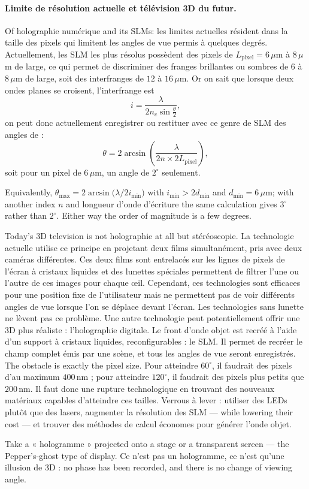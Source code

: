 \paragraph{Limite de résolution actuelle et télévision 3D du futur.}
Of holographie numérique and its SLMs: les limites actuelles résident dans la
taille des pixels qui limitent les angles de vue permis à quelques degrés.
Actuellement, les SLM les plus résolus possèdent des pixels de
$L_{\text{pixel}} = 6\,\mu$m à $8\,\mu$m de large, ce qui permet de discriminer
des franges brillantes ou sombres de $6$ à $8\,\mu$m de large, soit des
interfranges de $12$ à $16\,\mu$m. Or on sait que lorsque deux ondes planes se
croisent, l'interfrange est
\begin{equation*}
  i = \frac{\lambda}{2 n_c \sin\frac{\theta}{2}},
\end{equation*}
on peut donc actuellement enregistrer ou restituer avec ce genre de SLM des
angles de :
\begin{equation*}
  \theta = 2\arcsin\!\left(\frac{\lambda}{2n\times 2L_{\text{pixel}}}\right),
\end{equation*}
soit pour un pixel de $6\,\mu$m, un angle de $2^{\circ}$ seulement.

\begin{remark}
  Equivalently, $\theta_{\max} = 2\arcsin\big(\lambda/2i_{\min}\big)$ with
  $i_{\min}>2d_{\min}$ and $d_{\min}=6\,\mu$m; with another index $n$ and
  longueur d'onde d'écriture the same calculation gives $3^{\circ}$ rather than
  $2^{\circ}$. Either way the order of magnitude is a few degrees.
\end{remark}

Today's 3D television is not holographie at all but stéréoscopie. La technologie
actuelle utilise ce principe en projetant deux films simultanément, pris avec
deux caméras différentes. Ces deux films sont entrelacés sur les lignes de pixels
de l'écran à cristaux liquides et des lunettes spéciales permettent de filtrer
l'une ou l'autre de ces images pour chaque œil. Cependant, ces technologies sont
efficaces pour une position fixe de l'utilisateur mais ne permettent pas de voir
différents angles de vue lorsque l'on se déplace devant l'écran. Les
technologies sans lunette ne lèvent pas ce problème. Une autre technologie peut
potentiellement offrir une 3D plus réaliste : l'holographie digitale. Le front
d'onde objet est recréé à l'aide d'un support à cristaux liquides,
reconfigurables : le SLM. Il permet de recréer le champ complet émis par une
scène, et tous les angles de vue seront enregistrés. The obstacle is exactly the
pixel size. Pour atteindre $60^{\circ}$, il faudrait des pixels d'au maximum
$400\,$nm ; pour atteindre $120^{\circ}$, il faudrait des pixels plus petits que
$200\,$nm. Il faut donc une rupture technologique en trouvant des nouveaux
matériaux capables d'atteindre ces tailles. Verrous à lever : utiliser
des LEDs plutôt que des lasers, augmenter la résolution des SLM --- while
lowering their cost --- et trouver des méthodes de calcul économes pour générer
l'onde objet.

\begin{remark}
  Take a « hologramme » projected onto a stage or a transparent screen --- the
  Pepper's-ghost type of display. Ce n'est pas un hologramme, ce n'est qu'une
  illusion de 3D : no phase has been recorded, and there is no change of viewing
  angle.
\end{remark}
